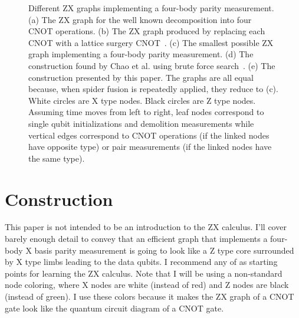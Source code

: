 \documentclass[onecolumn,unpublished,a4paper]{quantumarticle}
\theoremstyle{definition}
\theoremstyle{definition}
\theoremstyle{definition}
\begin{document}
\begin{figure}
    \centering
    \caption{
        Different ZX graphs implementing a four-body parity measurement.
        (a) The ZX graph for the well known decomposition into four CNOT operations.
        (b) The ZX graph produced by replacing each CNOT with a lattice surgery CNOT~\cite{horsman2012latticesurgery}.
        (c) The smallest possible ZX graph implementing a four-body parity measurement.
        (d) The construction found by Chao et al. using brute force search~\cite{chao2020optimization}.
        (e) The construction presented by this paper.
        The graphs are all equal because, when spider fusion is repeatedly applied, they reduce to (c).
        White circles are X type nodes.
        Black circles are Z type nodes.
        Assuming time moves from left to right, leaf nodes correspond to single qubit initializations and demolition measurements while vertical edges correspond to CNOT operations (if the linked nodes have opposite type) or pair measurements (if the linked nodes have the same type).
    }
    \label{fig:zx_identities}
\end{figure}

\section{Construction}
\label{sec:construction}

This paper is not intended to be an introduction to the ZX calculus.
I'll cover barely enough detail to convey that an efficient graph that implements a four-body X basis parity measurement is going to look like a Z type core surrounded by X type limbs leading to the data qubits.
I recommend any of \cite{backens2016simplifiedzx,de2017zxlattice,coecke2017picturing} as starting points for learning the ZX calculus.
Note that I will be using a non-standard node coloring, where X nodes are white (instead of red) and Z nodes are black (instead of green).
I use these colors because it makes the ZX graph of a CNOT gate look like the quantum circuit diagram of a CNOT gate.
\end{document}
